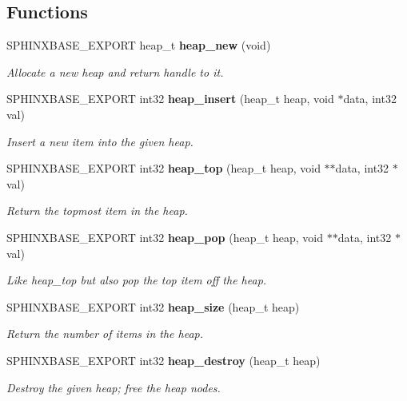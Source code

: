 \subsection*{Functions}
\begin{CompactItemize}
\item 
SPHINXBASE\_\-EXPORT heap\_\-t {\bf heap\_\-new} (void)\label{heap_8h_5b174d0db189ce4c517aa24d71c562dd}

\begin{CompactList}\small\item\em Allocate a new heap and return handle to it. \item\end{CompactList}\item 
SPHINXBASE\_\-EXPORT int32 {\bf heap\_\-insert} (heap\_\-t heap, void $\ast$data, int32 val)
\begin{CompactList}\small\item\em Insert a new item into the given heap. \item\end{CompactList}\item 
SPHINXBASE\_\-EXPORT int32 {\bf heap\_\-top} (heap\_\-t heap, void $\ast$$\ast$data, int32 $\ast$val)
\begin{CompactList}\small\item\em Return the topmost item in the heap. \item\end{CompactList}\item 
SPHINXBASE\_\-EXPORT int32 {\bf heap\_\-pop} (heap\_\-t heap, void $\ast$$\ast$data, int32 $\ast$val)\label{heap_8h_098bf692ecfc3ee7f3b49a72adc8c7b7}

\begin{CompactList}\small\item\em Like heap\_\-top but also pop the top item off the heap. \item\end{CompactList}\item 
SPHINXBASE\_\-EXPORT int32 {\bf heap\_\-size} (heap\_\-t heap)\label{heap_8h_42a4791822d16ccabd72906b4b6892c6}

\begin{CompactList}\small\item\em Return the number of items in the heap. \item\end{CompactList}\item 
SPHINXBASE\_\-EXPORT int32 {\bf heap\_\-destroy} (heap\_\-t heap)
\begin{CompactList}\small\item\em Destroy the given heap; free the heap nodes. \item\end{CompactList}\end{CompactItemize}


